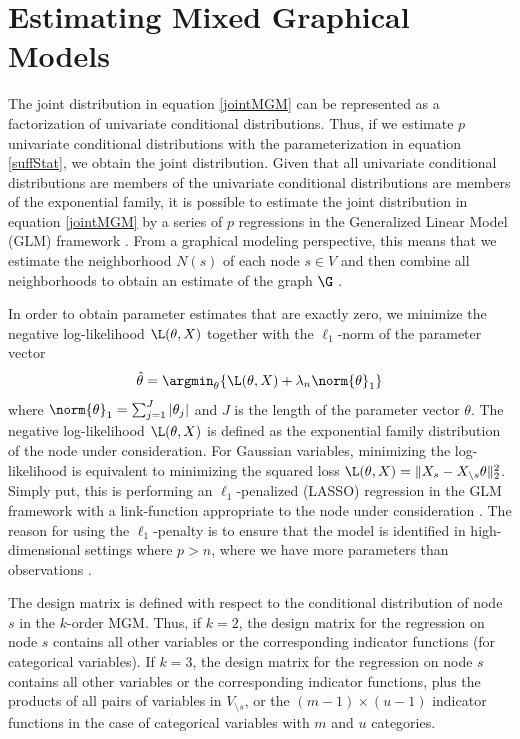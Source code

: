 \section{Estimating Mixed Graphical Models}
The joint distribution in equation \ref{jointMGM} can be represented as a factorization of univariate conditional distributions. Thus, if we estimate $p$ univariate conditional distributions with the parameterization in equation \ref{suffStat}, we obtain the joint distribution. Given that all univariate conditional distributions are members of the univariate conditional distributions are members of the exponential family, it is possible to estimate the joint distribution in equation \ref{jointMGM} by a series of $p$ regressions in the Generalized Linear Model (GLM) framework \cite{nelder1972generalized}. From a graphical modeling perspective, this means that we estimate the neighborhood $N(s)$ of each node $s \in V$ and then combine all neighborhoods to obtain an estimate of the graph $\G$ \cite{meinshausen2006high}.

In order to obtain parameter estimates that are exactly zero, we minimize the negative log-likelihood $\L(\theta,X)$ together with the $\ell_1$-norm of the parameter vector
\begin{equation} \label{lassoMGM}
    \hat{\theta}=\argmin_{\theta} \{\L(\theta,X) + \lambda_n \norm{\theta}_{1}\}
\end{equation}
where $\norm{\theta}_{1} = \sum_{j=1}^{J} |\theta_j|$ and $J$ is the length of the parameter vector $\theta$. The negative log-likelihood $\L(\theta,X)$ is defined as the exponential family distribution of the node under consideration. For Gaussian variables, minimizing the log-likelihood is equivalent to minimizing the squared loss $\L(\theta,X) = \lVert X_s - X_{\setminus s} \theta \rVert_{2}^{2}$. Simply put, this is performing an $\ell_1$-penalized (LASSO) regression in the GLM framework with a link-function appropriate to the node under consideration \cite{nelder1972generalized}. The reason for using the $\ell_1$-penalty is to ensure that the model is identified in high-dimensional settings where $p > n$, where we have more parameters than observations \cite{hastie2015statistical}. 

The design matrix is defined with respect to the conditional distribution of node $s$ in the $k$-order MGM. Thus, if $k=2$, the design matrix for the regression on node $s$ contains all other variables or the corresponding indicator functions (for categorical variables). If $k=3$, the design matrix for the regression on node $s$ contains all other variables or the corresponding indicator functions, plus the products of all pairs of variables in $V_{\setminus s}$, or the $(m-1) \times (u-1)$ indicator functions in the case of categorical variables with $m$ and $u$ categories.

